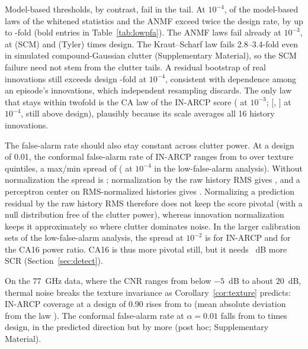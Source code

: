 \documentclass[journal]{IEEEtran}
\begin{document}
Model-based thresholds, by contrast, fail in the tail. At $10^{-4}$, \NWhitenedLawsFail{} of the \NWhitenedLaws{} model-based laws of the whitened statistics and the ANMF exceed twice the design rate, by up to \LAnalMaxFour-fold (bold entries in Table~\ref{tab:lowpfa}). The ANMF laws fail already at $10^{-3}$, at \LScmThree{} (SCM) and \LFpThree{} (Tyler) times design. The Kraut--Scharf law fails 2.8--3.4-fold even in simulated compound-Gaussian clutter (Supplementary Material), so the SCM failure need not stem from the clutter tails. A residual bootstrap of real innovations still exceeds design \LBootFour-fold at $10^{-4}$, consistent with dependence among an episode's innovations, which independent resampling discards. The only law that stays within twofold is the CA law of the IN-ARCP score (\LInAnalThree{} at $10^{-3}$; \LInAnalFour{} [\InAnalFourLo, \InAnalFourHi] at $10^{-4}$, still above design), plausibly because its scale averages all 16 history innovations.

The false-alarm rate should also stay constant across clutter power. At a design of 0.01, the conformal false-alarm rate of IN-ARCP ranges from \QPfaINMin{} to \QPfaINMax{} over texture quintiles, a max/min spread of \QPfaINSpread{} (\LInConfSpreadFour{} at $10^{-4}$ in the low-false-alarm analysis). Without normalization the spread is \QPfaUSpread; normalization by the raw history RMS gives \QPfaRMSSpread, and a perceptron center on RMS-normalized histories gives \QPfaMLPSpread. Normalizing a prediction residual by the raw history RMS therefore does not keep the score pivotal (with a null distribution free of the clutter power), whereas innovation normalization keeps it approximately so where clutter dominates noise. In the larger calibration sets of the low-false-alarm analysis, the spread at $10^{-2}$ is \NetSpreadInIpix{} for IN-ARCP and \NetSpreadCaIpix{} for the CA16 power ratio. CA16 is thus more pivotal still, but it needs \DetINGainCAHalf~dB more SCR (Section~\ref{sec:detect}).

On the 77~GHz data, where the CNR ranges from below $-5$~dB to about 20~dB, thermal noise breaks the texture invariance as Corollary~\ref{cor:texture} predicts: IN-ARCP coverage at a design of 0.90 rises from \JInLow{} to \JInHigh{} (mean absolute deviation from the law \JMae). The conformal false-alarm rate at $\alpha=0.01$ falls from \JPfaRatioLow{} to \JPfaRatioHigh{} times design, in the predicted direction but by more (post hoc; Supplementary Material).
\end{document}
